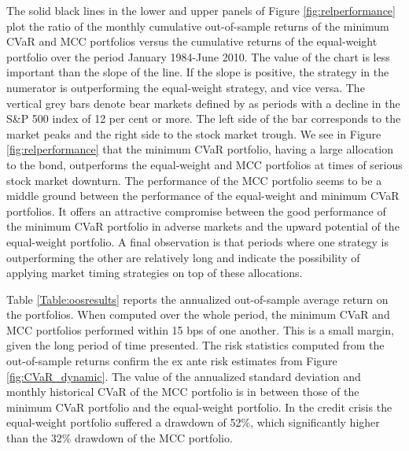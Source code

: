 \documentclass[12pt,a4paper]{article}
\begin{document}
The solid black lines in the lower and upper panels of Figure \ref{fig:relperformance} plot the ratio of the monthly cumulative out-of-sample returns of the minimum CVaR and MCC portfolios versus the cumulative returns of the equal-weight portfolio over the period January 1984-June 2010. The value of the chart is less important than the slope of the line. If the slope is positive, the strategy in the numerator is outperforming the equal-weight strategy, and vice versa. The vertical grey bars denote bear markets defined by \citet{Ellis2005} as periods with a decline in the S\&P 500 index of 12 per cent or more. The left side of the bar corresponds to the market peaks and the right side to the stock market trough.  We see in Figure \ref{fig:relperformance} that the minimum CVaR portfolio, having a large allocation to the bond, outperforms the equal-weight and MCC portfolios at times of serious stock market downturn. The performance of the MCC portfolio seems to be a middle ground between the performance of the equal-weight and minimum CVaR portfolios. It offers an attractive compromise between the good performance of the minimum CVaR portfolio in adverse markets and the upward potential of the equal-weight portfolio. A final observation is that periods where one strategy is outperforming the other are relatively long and indicate the possibility of applying market timing strategies on top of these allocations.

Table \ref{Table:oosresults} reports the annualized out-of-sample average return on the portfolios. When computed over the whole period, the minimum CVaR and MCC portfolios performed within 15 bps of one another. This is a small margin, given the long period of time presented. The risk statistics computed from the out-of-sample returns confirm the ex ante risk estimates from Figure \ref{fig:CVaR_dynamic}.  The value of the annualized standard deviation and monthly historical CVaR of the MCC portfolio is in between those of the minimum CVaR portfolio and the equal-weight portfolio.    In the credit crisis the equal-weight portfolio suffered a drawdown of 52\%, which significantly higher than the 32\%  drawdown of the MCC portfolio.
\end{document}
